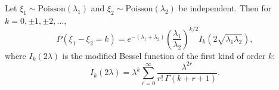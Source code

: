 Let $\xi_1 \sim \text{Poisson}(\lambda_1)$ and $\xi_2 \sim \text{Poisson}(\lambda_2)$ be independent. Then for $k = 0, \pm 1, \pm 2, \ldots$,
$$P(\xi_1 - \xi_2 = k) = e^{-(\lambda_1 + \lambda_2)} \left(\frac{\lambda_1}{\lambda_2}\right)^{k/2} I_k\!\left(2\sqrt{\lambda_1 \lambda_2}\right),$$
where $I_k(2\lambda)$ is the modified Bessel function of the first kind of order $k$:
$$I_k(2\lambda) = \lambda^k \sum_{r=0}^{\infty} \frac{\lambda^{2r}}{r! \, \Gamma(k+r+1)}.$$
